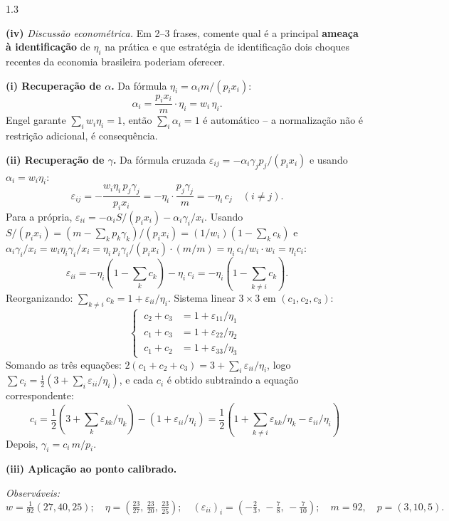 \documentclass[11pt,addpoints]{exam}
\begin{document}
\begin{spacing}{1.3}
\begin{questions}
\begin{parts}
\textbf{(iv)} \emph{Discussão econométrica.} Em 2--3 frases, comente qual é a principal \textbf{ameaça à identificação} de $\eta_i$ na prática e que estratégia de identificação dois choques recentes da economia brasileira poderiam oferecer.

\begin{solution}
\textbf{(i) Recuperação de $\alpha$.} Da fórmula $\eta_i = \alpha_i m/(p_i x_i)$:
\[
    \alpha_i = \frac{p_i x_i}{m}\cdot \eta_i = w_i\, \eta_i. \quad \boxed{\phantom{x}}
\]
Engel garante $\sum_i w_i \eta_i = 1$, então $\sum_i \alpha_i = 1$ é automático -- a normalização não é restrição adicional, é consequência.

\textbf{(ii) Recuperação de $\gamma$.} Da fórmula cruzada $\varepsilon_{ij} = -\alpha_i \gamma_j p_j/(p_i x_i)$ e usando $\alpha_i = w_i \eta_i$:
\[
    \varepsilon_{ij} = -\frac{w_i \eta_i\, p_j \gamma_j}{p_i x_i} = -\eta_i\cdot \frac{p_j \gamma_j}{m} = -\eta_i\, c_j\quad (i \neq j). \quad \boxed{\phantom{x}}
\]
Para a própria, $\varepsilon_{ii} = -\alpha_i S/(p_i x_i) - \alpha_i \gamma_i/x_i$. Usando $S/(p_i x_i) = (m - \sum_k p_k \gamma_k)/(p_i x_i) = (1/w_i)(1 - \sum_k c_k)$ e $\alpha_i \gamma_i/x_i = w_i \eta_i \gamma_i/x_i = \eta_i\, p_i \gamma_i/(p_i x_i) \cdot (m/m) = \eta_i\, c_i/w_i \cdot w_i = \eta_i c_i$:
\[
    \varepsilon_{ii} = -\eta_i(1 - \textstyle\sum_k c_k) - \eta_i\, c_i = -\eta_i\!\left(1 - \textstyle\sum_{k \neq i} c_k\right). \quad \boxed{\phantom{x}}
\]
Reorganizando: $\sum_{k \neq i} c_k = 1 + \varepsilon_{ii}/\eta_i$. Sistema linear $3\times 3$ em $(c_1, c_2, c_3)$:
\[
\begin{cases}
\ c_2 + c_3 &= 1 + \varepsilon_{11}/\eta_1\\
\ c_1 + c_3 &= 1 + \varepsilon_{22}/\eta_2\\
\ c_1 + c_2 &= 1 + \varepsilon_{33}/\eta_3
\end{cases}
\]
Somando as três equações: $2(c_1 + c_2 + c_3) = 3 + \sum_i \varepsilon_{ii}/\eta_i$, logo $\sum c_i = \tfrac{1}{2}(3 + \sum_i \varepsilon_{ii}/\eta_i)$, e cada $c_i$ é obtido subtraindo a equação correspondente:
\[
    \boxed{\ c_i = \frac{1}{2}\!\left(3 + \textstyle\sum_k \varepsilon_{kk}/\eta_k\right) - \left(1 + \varepsilon_{ii}/\eta_i\right) = \frac{1}{2}\!\left(1 + \sum_{k \neq i}\varepsilon_{kk}/\eta_k - \varepsilon_{ii}/\eta_i\right)\ }
\]
Depois, $\gamma_i = c_i\, m/p_i$.

\textbf{(iii) Aplicação ao ponto calibrado.}

\emph{Observáveis:}
\[
    w = \tfrac{1}{92}(27, 40, 25);\quad \eta = (\tfrac{23}{27},\, \tfrac{23}{20},\, \tfrac{23}{25});\quad
    (\varepsilon_{ii})_i = (-\tfrac{2}{3},\, -\tfrac{7}{8},\, -\tfrac{7}{10});\quad m = 92,\quad p = (3, 10, 5).
\]


\end{solution}
\end{parts}
\end{questions}
\end{spacing}
\end{document}
